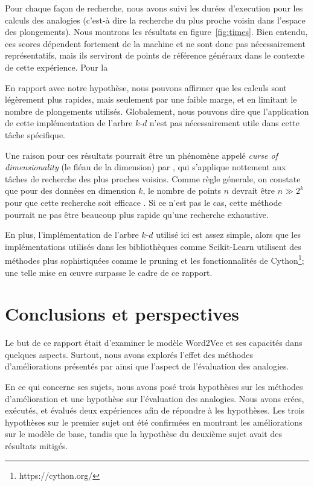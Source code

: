 \documentclass[12pt]{article}
\begin{document}
Pour chaque façon de recherche, nous avons suivi les durées d'execution pour les calculs des analogies (c'est-à dire la recherche du plus proche voisin dans l'espace des plongements). Nous montrons les résultats en figure~\ref{fig:times}. Bien entendu, ces scores dépendent fortement de la machine et ne sont donc pas nécessairement représentatifs, mais ils serviront de points de référence généraux dans le contexte de cette expérience. Pour la 

En rapport avec notre hypothèse, nous pouvons affirmer que les calculs sont légèrement plus rapides, mais seulement par une faible marge, et en limitant le nombre de plongements utilisés. Globalement, nous pouvons dire que l'application de cette implémentation de l'arbre $k$-$d$ n'est pas nécessairement utile dans cette tâche spécifique.

Une raison pour ces résultats pourrait être un phénomène appelé \textit{curse of dimensionality} (le fléau de la dimension) par \cite{Freimer1961AdaptiveCP}, qui s'applique nottement aux tâches de recherche des plus proches voisins. Comme règle génerale, on constate que pour des données en dimension $ k $, le nombre de points $ n $ devrait être $ n \gg 2^k $ pour que cette recherche soit efficace \citep{indyk2004nearest}. Si ce n'est pas le cas, cette méthode pourrait ne pas être beaucoup plus rapide qu'une recherche exhaustive.

En plus, l'implémentation de l'arbre $k$-$d$ utilisé ici est assez simple, alors que les implémentations utilisés dans les bibliothèques comme Scikit-Learn utilisent des méthodes plus sophistiquées comme le pruning et les fonctionnalités de Cython\footnote{https://cython.org/}; une telle mise en œuvre surpasse le cadre de ce rapport. 

\section{Conclusions et perspectives} \label{conclusions et perspectives}

Le but de ce rapport était d'examiner le modèle Word2Vec et ses capacités dans quelques aspects. Surtout, nous avons explorés l'effet des méthodes d'améliorations présentés par \cite{DBLP:conf/nips/MikolovSCCD13} ainsi que l'aspect de l'évaluation des analogies.

En ce qui concerne ses sujets, nous avons posé trois hypothèses sur les méthodes d'amélioration et une hypothèse sur l'évaluation des analogies. Nous avons crées, exécutés, et évalués deux expériences afin de répondre à les hypothèses. Les trois hypothèses sur le premier sujet ont été confirmées en montrant les améliorations sur le modèle de base, tandis que la hypothèse du deuxième sujet avait des résultats mitigés.


 
\end{document}
